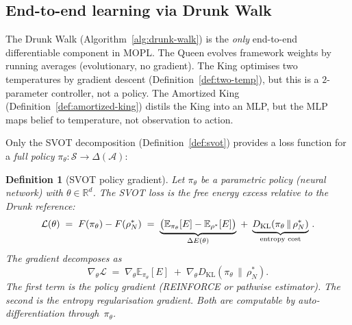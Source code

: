 \documentclass[11pt,a4paper]{article}
\newtheorem{definition}[theorem]{Definition}
\newcommand{\R}{\mathbb{R}}
\newcommand{\cL}{\mathcal{L}}
\newcommand{\cS}{\mathcal{S}}
\newcommand{\cA}{\mathcal{A}}
\newcommand{\DKL}{D_{\mathrm{KL}}}
\begin{document}
\subsection{End-to-end learning via Drunk Walk}\label{sec:e2e}

The Drunk Walk (Algorithm~\ref{alg:drunk-walk}) is the
\emph{only} end-to-end differentiable component in MOPL\@.
The Queen evolves framework weights by running averages
(evolutionary, no gradient).
The King optimises two temperatures by gradient descent
(Definition~\ref{def:two-temp}), but this is a
$2$-parameter controller, not a policy.
The Amortized King (Definition~\ref{def:amortized-king})
distils the King into an MLP, but the MLP maps
belief to temperature, not observation to action.

Only the SVOT decomposition (Definition~\ref{def:svot})
provides a loss function for a \emph{full policy}
$\pi_\theta \colon \cS \to \Delta(\cA)$:

\begin{definition}[SVOT policy gradient]\label{def:svot-pg}
Let $\pi_\theta$ be a parametric policy (neural network)
with $\theta \in \R^d$.
The \emph{SVOT loss} is the free energy excess relative
to the Drunk reference:
\begin{equation}\label{eq:svot-loss}
  \cL(\theta)
  \;=\;
  F(\pi_\theta) - F(\rho^*_N)
  \;=\;
  \underbrace{\bigl(\mathbb{E}_{\pi_\theta}[E]
    - \mathbb{E}_{\rho^*}[E]\bigr)}_{\Delta E(\theta)}
  \;+\;
  \underbrace{\DKL(\pi_\theta \,\|\, \rho^*_N)}_{%
    \text{entropy cost}}\,.
\end{equation}
The gradient decomposes as
\[
  \nabla_\theta \cL
  \;=\;
  \nabla_\theta \mathbb{E}_{\pi_\theta}[E]
  \;+\;
  \nabla_\theta \DKL(\pi_\theta \,\|\, \rho^*_N).
\]
The first term is the policy gradient (REINFORCE or
pathwise estimator).
The second is the entropy regularisation gradient.
Both are computable by auto-differentiation
through~$\pi_\theta$.
\end{definition}
\end{document}
